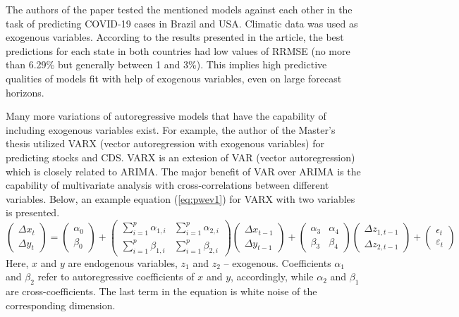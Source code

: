 \documentclass[3p,times,procedia]{elsarticle}
\begin{document}
The authors of the paper \cite{da2020forecasting} tested the mentioned models against each other in the task of predicting COVID-19 cases in Brazil and USA. Climatic data was used as exogenous variables. According to the results presented in the article, the best predictions for each state in both countries had low values of RRMSE (no more than 6.29\% but generally between 1 and 3\%). This implies high predictive qualities of models fit with help of exogenous variables, even on large forecast horizons.

Many more variations of autoregressive models that have the capability of including exogenous variables exist. For example, the author of the Master's thesis \cite{ding2021empirical} utilized VARX (vector autoregression with exogenous variables) for predicting stocks and CDS. VARX is an extesion of VAR (vector autoregression) which is closely related to ARIMA. The major benefit of VAR over ARIMA is the capability of multivariate analysis with cross-correlations between different variables. Below, an example equation (\ref{eq:pwev1}) for VARX with two variables is presented.
\begin{equation} \label{eq:pwev1}
\begin{pmatrix}\Delta x_t \\ \Delta y_t \end{pmatrix}
= \begin{pmatrix}\alpha_0 \\ \beta_0 \end{pmatrix}
+ \begin{pmatrix}\sum_{i=1}^p \alpha_{1,i} & \sum_{i=1}^p \alpha_{2,i} \\ \sum_{i=1}^p \beta_{1,i} & \sum_{i=1}^p \beta_{2,i} \end{pmatrix}
\begin{pmatrix}\Delta x_{t-1} \\ \Delta y_{t-1} \end{pmatrix}
+ \begin{pmatrix}\alpha_3 & \alpha_4 \\ \beta_3 & \beta_4 \end{pmatrix}
\begin{pmatrix}\Delta z_{1, t-1} \\ \Delta z_{2, t-1} \end{pmatrix}
+ \begin{pmatrix}\epsilon_t \\ \varepsilon_t \end{pmatrix}
\end{equation}
Here, $x$ and $y$ are endogenous variables, $z_1$ and $z_2$ -- exogenous. Coefficients $\alpha_1$ and $\beta_2$ refer to autoregressive coefficients of $x$ and $y$, accordingly, while $\alpha_2$ and $\beta_1$ are cross-coefficients. The last term in the equation is white noise of the corresponding dimension.
\end{document}
